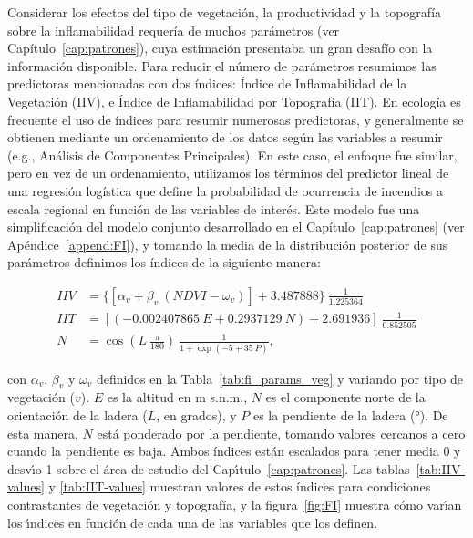 Considerar los efectos del tipo de vegetación, la productividad y la topografía sobre la inflamabilidad requería de muchos parámetros (ver Capítulo~\ref{cap:patrones}), cuya estimación presentaba un gran desafío con la información disponible. Para reducir el número de parámetros resumimos las predictoras mencionadas con dos índices: Índice de Inflamabilidad de la Vegetación (IIV), e Índice de Inflamabilidad por Topografía (IIT). En ecología es frecuente el uso de índices para resumir numerosas predictoras, y generalmente se obtienen mediante un ordenamiento de los datos según las variables a resumir (e.g., Análisis de Componentes Principales). En este caso, el enfoque fue similar, pero en vez de un ordenamiento, utilizamos los términos del predictor lineal de una regresión logística que define la probabilidad de ocurrencia de incendios a escala regional en función de las variables de interés. Este modelo fue una simplificación del modelo conjunto desarrollado en el Capítulo~\ref{cap:patrones} (ver Apéndice~\ref{append:FI}), y tomando la media de la distribución posterior de sus parámetros definimos los índices de la siguiente manera:  

\begin{equation}
\label{eq:FI}
\begin{aligned}
    IIV &= \{[\alpha_v + \beta_v \ (NDVI - \omega_v)] + 3.487888\} \ \frac{1}{1.225364} \\
    IIT &= [(-0.002407865 \ E + 0.2937129 \ N) + 2.691936] \ \frac{1}{0.852505} \\
    N & = \cos \left(L \  \frac{\pi}{180}\right) \ \frac{1}{1 + \exp(-5 + 35 \ P)},
\end{aligned}
\end{equation}

\noindent con $\alpha_v$, $\beta_v$ y $\omega_v$ definidos en la Tabla~\ref{tab:fi_params_veg} y variando por tipo de vegetación ($v$). $E$ es la altitud en m s.n.m., $N$ es el componente norte de la orientación de la ladera ($L$, en grados), y $P$ es la pendiente de la ladera (°). De esta manera, $N$ está ponderado por la pendiente, tomando valores cercanos a cero cuando la pendiente es baja. Ambos índices están escalados para tener media 0 y desvı́o 1 sobre el área de estudio del Capı́tulo~\ref{cap:patrones}. Las tablas~\ref{tab:IIV-values} y \ref{tab:IIT-values} muestran valores de estos índices para condiciones contrastantes de vegetación y topografía, y la figura~\ref{fig:FI} muestra cómo varı́an los ı́ndices en función de cada una de las variables que los definen.

